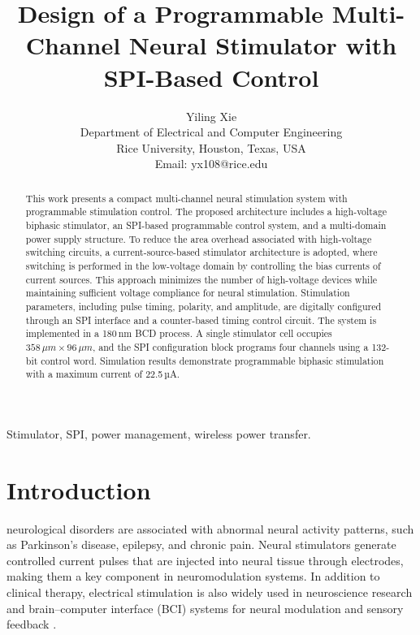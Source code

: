 \documentclass[lettersize,journal]{IEEEtran}
\begin{document}
\title{Design of a Programmable Multi-Channel Neural Stimulator with SPI-Based Control}

\author{Yiling Xie\\ Department of Electrical and Computer Engineering\\
Rice University, Houston, Texas, USA\\
Email: yx108@rice.edu}
\maketitle

\begin{abstract}

This work presents a compact multi-channel neural stimulation system with programmable stimulation control. The proposed architecture includes a high-voltage biphasic stimulator, an SPI-based programmable control system, and a multi-domain power supply structure. To reduce the area overhead associated with high-voltage switching circuits, a current-source-based stimulator architecture is adopted, where switching is performed in the low-voltage domain by controlling the bias currents of current sources. This approach minimizes the number of high-voltage devices while maintaining sufficient voltage compliance for neural stimulation. Stimulation parameters, including pulse timing, polarity, and amplitude, are digitally configured through an SPI interface and a counter-based timing control circuit. The system is implemented in a 180\,nm BCD process. A single stimulator cell occupies $358\,\mu m \times 96\,\mu m$, and the SPI configuration block programs four channels using a 132-bit control word. Simulation results demonstrate programmable biphasic stimulation with a maximum current of 22.5\,µA.

\end{abstract}

\begin{IEEEkeywords}
Stimulator, SPI, power management, wireless power transfer.
\end{IEEEkeywords}

\section{Introduction}
 neurological disorders are associated with abnormal neural activity patterns, such as Parkinson’s disease, epilepsy, and chronic pain. Neural stimulators generate controlled current pulses that are injected into neural tissue through electrodes, making them a key component in neuromodulation systems. In addition to clinical therapy, electrical stimulation is also widely used in neuroscience research and brain–computer interface (BCI) systems for neural modulation and sensory feedback \cite{ref1,ref2,ref3}.
\end{document}
